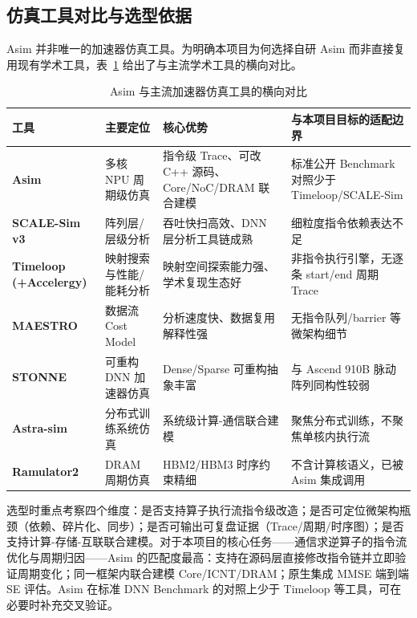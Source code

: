 \documentclass{CjC}
\begin{document}
\subsection{仿真工具对比与选型依据}

Asim 并非唯一的加速器仿真工具。为明确本项目为何选择自研 Asim 而非直接复用现有学术工具，表~\ref{tab:sim-tool-comparison} 给出了与主流学术工具的横向对比。

\begin{table}[H]
    \centering
    \caption{Asim 与主流加速器仿真工具的横向对比}
    \label{tab:sim-tool-comparison}
    \begin{tabular}{p{2.6cm} p{3.0cm} p{3.8cm} p{5.2cm}}
    \toprule
    \textbf{工具} & \textbf{主要定位} & \textbf{核心优势} & \textbf{与本项目目标的适配边界} \\
    \midrule
    \textbf{Asim} & 多核 NPU 周期级仿真 & 指令级 Trace、可改 C++ 源码、Core/NoC/DRAM 联合建模 & 标准公开 Benchmark 对照少于 Timeloop/SCALE-Sim \\
    \midrule
    \textbf{SCALE-Sim v3} & 阵列层/层级分析 & 吞吐快扫高效、DNN 层分析工具链成熟 & 细粒度指令依赖表达不足 \\
    \midrule
    \textbf{Timeloop (+Accelergy)} & 映射搜索与性能/能耗分析 & 映射空间探索能力强、学术复现生态好 & 非指令执行引擎，无逐条 start/end 周期 Trace \\
    \midrule
    \textbf{MAESTRO} & 数据流 Cost Model & 分析速度快、数据复用解释性强 & 无指令队列/barrier 等微架构细节 \\
    \midrule
    \textbf{STONNE} & 可重构 DNN 加速器仿真 & Dense/Sparse 可重构抽象丰富 & 与 Ascend 910B 脉动阵列同构性较弱 \\
    \midrule
    \textbf{Astra-sim} & 分布式训练系统仿真 & 系统级计算-通信联合建模 & 聚焦分布式训练，不聚焦单核内执行流 \\
    \midrule
    \textbf{Ramulator2} & DRAM 周期仿真 & HBM2/HBM3 时序约束精细 & 不含计算核语义，已被 Asim 集成调用 \\
    \bottomrule
    \end{tabular}
\end{table}

选型时重点考察四个维度：是否支持算子执行流指令级改造；是否可定位微架构瓶颈（依赖、碎片化、同步）；是否可输出可复盘证据（Trace/周期/时序图）；是否支持计算-存储-互联联合建模。对于本项目的核心任务——通信求逆算子的指令流优化与周期归因——Asim 的匹配度最高：支持在源码层直接修改指令链并立即验证周期变化；同一框架内联合建模 Core/ICNT/DRAM；原生集成 MMSE 端到端 SE 评估。Asim 在标准 DNN Benchmark 的对照上少于 Timeloop 等工具，可在必要时补充交叉验证。
\end{document}
